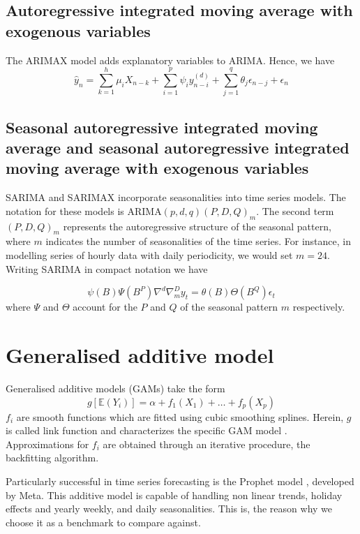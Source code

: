 \subsection{Autoregressive integrated moving average with exogenous variables}
The ARIMAX model adds explanatory variables to ARIMA. Hence, we have
\begin{equation}
    \hat{y}_n=\sum\limits_{k=1}^{h} \mu_i X_{n-k}+\sum\limits_{i=1}^{p}\psi_i y_{n-i}^{(d)}+\sum\limits_{j=1}^{q}\theta_j \epsilon_{n-j}+ \epsilon_{n}
\end{equation}
\subsection{Seasonal autoregressive integrated moving average and seasonal autoregressive integrated moving average with exogenous variables}
SARIMA and SARIMAX incorporate seasonalities into time series models. The notation for these models is ARIMA$(p,d,q)(P,D,Q)_m$. The second term $(P,D,Q)_m$ represents the autoregressive structure of the seasonal pattern, where $m$ indicates the number of seasonalities of the time series.
For instance, in modelling series of hourly data with daily periodicity, we would set $m=24$.
Writing SARIMA in compact notation we have

\begin{equation}
    \psi(B)\Psi(B^P)\nabla^d\nabla_m^Dy_t=\theta(B)\Theta(B^Q)\epsilon_t
\end{equation}
where $\Psi$ and $\Theta$ account for the $P$ and $Q$ of the seasonal pattern $m$ respectively.
\section{Generalised additive model}
Generalised additive models (GAMs) take the form
\begin{equation}
    g[\mathbb{E}(Y_i)]=\alpha+f_1(X_1)+\dots+f_p(X_p)
\end{equation}
$f_i$ are smooth functions which are fitted using cubic smoothing splines.
Herein, $g$ is called link function and characterizes the specific GAM model \cite{hastie2017generalized}. Approximations for $f_i$ are obtained through an iterative procedure, the backfitting algorithm.

Particularly successful in time series forecasting is the Prophet model \cite{taylor2018forecasting}, developed by Meta. This additive model is capable of handling non linear trends, holiday effects and yearly weekly, and daily seasonalities. This is, the reason why we choose it as a benchmark to compare against.
